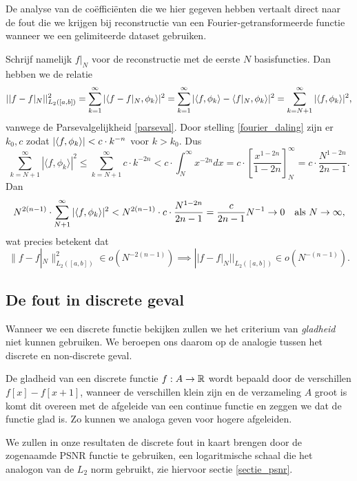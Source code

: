 De analyse van de co\"effici\"enten die we hier gegeven hebben vertaalt direct naar de fout die we krijgen
bij reconstructie van een Fourier-getransformeerde functie wanneer we een gelimiteerde dataset gebruiken.

\begin{gevolg}
Schrijf namelijk $f|_{N}$ voor de reconstructie met de eerste $N$ basisfuncties. Dan hebben we de relatie
\[
  || f - f|_N||^2_{L_2([a,b])} = \sum_{k=1}^\infty |\langle f-f|_N , \phi_k \rangle|^2 = \sum_{k=1}^\infty |\langle f , \phi_k \rangle 
  - \langle f|_N , \phi_k \rangle|^2 = \sum_{k=N+1}^\infty |\langle f , \phi_k \rangle|^2,
\]
vanwege de Parsevalgelijkheid \ref{parseval}. Door stelling \ref{fourier_daling} zijn er $k_0, c$ zodat ${\left| \langle f , \phi_k \rangle \right|} < c\cdot k^{-n}$ voor $k > k_0$. Dus
\[
	\sum_{k=N+1}^\infty | \langle f, \phi_{k} \rangle |^2 \leq \sum_{k=N+1}^\infty c \cdot k^{-2n} < c \cdot \int_{N}^\infty x^{-2n} dx = c \cdot \left[ \frac{x^{1-2n}}{1-2n} \right]^\infty_N = c \cdot \frac{N^{1-2n}}{2n-1}.
\]
Dan
\[
N^{2(n-1)} \cdot \sum_{N+1}^\infty |\langle f , \phi_k \rangle|^2 < N^{2(n-1)} \cdot c \cdot \frac{N^{1-2n}}{2n-1} = \frac{c}{2n-1} N^{-1} \to 0 \quad \text{als } N\to\infty,
\]
wat precies betekent dat
 \[
\|f-f|_{N}\|^2_{L_2([a,b])} \in o\left ( N^{-2(n-1)} \right) 
\implies ||f - f|_{N}||_{L_2([a,b])} \in o\left(N^{-(n-1)}\right).
\]
\end{gevolg}

\subsection{De fout in discrete geval}
Wanneer we een discrete functie bekijken zullen we het criterium van \emph{gladheid} niet kunnen gebruiken.
We beroepen ons daarom op de analogie tussen het discrete en non-discrete geval.

De gladheid van een discrete functie $f:A\to\mathbb{R}$ wordt bepaald door de verschillen $f[x]-f[x+1]$,
wanneer de verschillen klein zijn en de verzameling $A$ groot is komt dit overeen met de afgeleide van een 
continue functie en zeggen we dat de functie glad is. Zo kunnen we analoga geven voor hogere afgeleiden.

We zullen in onze resultaten de discrete fout in kaart brengen door de zogenaamde PSNR functie te gebruiken,
een logaritmische schaal die het analogon van de $L_2$ norm gebruikt, zie hiervoor sectie \ref{sectie_psnr}.

